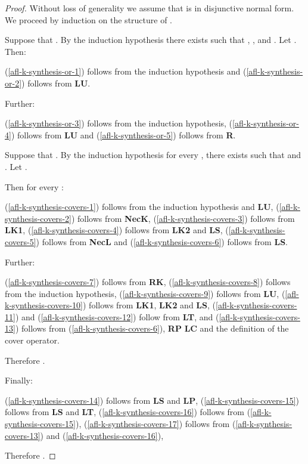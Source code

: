 \documentclass[twoside]{aiml14}
\begin{document}
  \begin{proof}
      Without loss of generality we assume that  is in disjunctive normal
      form. We proceed by induction on the structure of .

      Suppose that . By the induction hypothesis 
      there exists  
      such that , 
      ,
       and
      .
      Let .
      Then:
      
      (\ref{afl-k-synthesis-or-1}) follows from the induction hypothesis and
      (\ref{afl-k-synthesis-or-2}) follows from {\bf LU}.

      Further:
      
      (\ref{afl-k-synthesis-or-3}) follows from the induction hypothesis,
      (\ref{afl-k-synthesis-or-4}) follows from {\bf LU} and
      (\ref{afl-k-synthesis-or-5}) follows from {\bf R}.

      Suppose that .
      By the induction hypothesis for every , 
      there exists  such that 
       and 
      .
      Let .

      Then for every : 
      
      (\ref{afl-k-synthesis-covers-1}) follows from the induction hypothesis and {\bf LU},
      (\ref{afl-k-synthesis-covers-2}) follows from {\bf NecK},
      (\ref{afl-k-synthesis-covers-3}) follows from {\bf LK1},
      (\ref{afl-k-synthesis-covers-4}) follows from {\bf LK2} and {\bf LS},
      (\ref{afl-k-synthesis-covers-5}) follows from {\bf NecL} and
      (\ref{afl-k-synthesis-covers-6}) follows from {\bf LS}.

      Further:
      
      (\ref{afl-k-synthesis-covers-7}) follows from {\bf RK},
      (\ref{afl-k-synthesis-covers-8}) follows from the induction hypothesis,
      (\ref{afl-k-synthesis-covers-9}) follows from {\bf LU},
      (\ref{afl-k-synthesis-covers-10}) follows from {\bf LK1}, {\bf LK2} and {\bf LS},
      (\ref{afl-k-synthesis-covers-11}) and (\ref{afl-k-synthesis-covers-12}) follow from {\bf LT}, and
      (\ref{afl-k-synthesis-covers-13}) follows from (\ref{afl-k-synthesis-covers-6}), {\bf RP} {\bf LC} and the definition of the cover operator.

      Therefore .

      Finally:
      
      (\ref{afl-k-synthesis-covers-14}) follows from {\bf LS} and {\bf LP},
      (\ref{afl-k-synthesis-covers-15}) follows from {\bf LS} and {\bf LT},
      (\ref{afl-k-synthesis-covers-16}) follows from (\ref{afl-k-synthesis-covers-15}),
      (\ref{afl-k-synthesis-covers-17}) follows from (\ref{afl-k-synthesis-covers-13}) and (\ref{afl-k-synthesis-covers-16}),

      Therefore .
  \end{proof}
\end{document}
